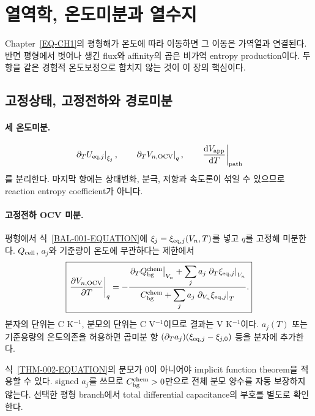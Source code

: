 \section{열역학, 온도미분과 열수지}\label{THM-CH2}

Chapter~\ref{EQ-CH1}의 평형해가 온도에 따라 이동하면 그 이동은
가역열과 연결된다. 반면 평형에서 벗어나 생긴 flux와 affinity의
곱은 비가역 entropy production이다. 두 항을 같은 경험적 온도보정으로
합치지 않는 것이 이 장의 핵심이다.

\subsection{고정상태, 고정전하와 경로미분}\label{THM-CH2-DERIVATIVES}

\paragraph{ 세 온도미분.}
\[
\left.\partial_T U_{\mathrm{eq},j}\right|_{\xi_j},\qquad
\left.\partial_T V_{n,\mathrm{OCV}}\right|_q,\qquad
\left.\frac{\mathrm d V_{\mathrm{app}}}{\mathrm d T}\right|_{\rm path}
\]
를 분리한다. 마지막 항에는 상태변화, 분극, 저항과 속도론이 섞일
수 있으므로 reaction entropy coefficient가 아니다.

\paragraph{ 고정전하 OCV 미분.}
평형에서 식~\eqref{BAL-001-EQUATION}에
$\xi_j=\xi_{\mathrm{eq},j}(V_n,T)$를 넣고 $q$를 고정해 미분한다.
$Q_{\mathrm{cell}}$, $a_j$와 기준량이 온도에 무관하다는 제한에서
\begin{equation}
\boxed{
\left.\frac{\partial V_{n,\mathrm{OCV}}}{\partial T}\right|_q
=-
\frac{
\left.\partial_T Q_{\mathrm{bg}}^{\mathrm{chem}}\right|_{V_n}
+\displaystyle\sum_j a_j
\left.\partial_T\xi_{\mathrm{eq},j}\right|_{V_n}
}{
C_{\mathrm{bg}}^{\mathrm{chem}}
+\displaystyle\sum_j a_j
\left.\partial_{V_n}\xi_{\mathrm{eq},j}\right|_T
}.
}
\label{THM-002-EQUATION}
\end{equation}
분자의 단위는 C K$^{-1}$, 분모의 단위는 C V$^{-1}$이므로
결과는 V K$^{-1}$이다. $a_j(T)$ 또는 기준용량의 온도의존을
허용하면 곱미분 항
$(\partial_Ta_j)(\xi_{\mathrm{eq},j}-\xi_{j,0})$ 등을 분자에 추가한다.

\begin{validity}
식~\eqref{THM-002-EQUATION}의 분모가 0이 아니어야 implicit
function theorem을 적용할 수 있다. signed $a_j$를 쓰므로
$C_{\mathrm{bg}}^{\mathrm{chem}}>0$만으로 전체 분모 양수를 자동 보장하지 않는다.
선택한 평형 branch에서 total differential capacitance의 부호를
별도로 확인한다.
\end{validity}

